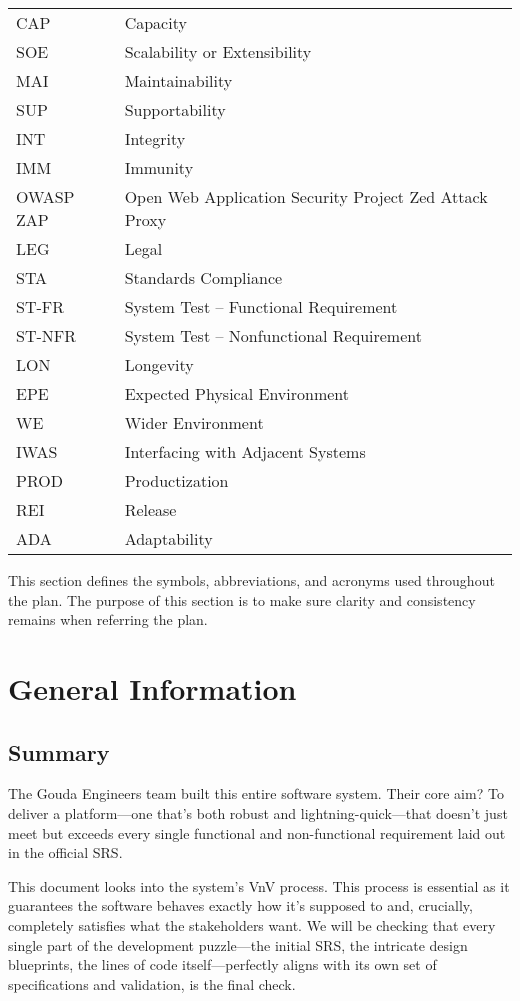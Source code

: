 \documentclass[12pt, titlepage]{article}
\begin{document}
\begin{longtable}{l l}
  CAP & Capacity \\
  SOE & Scalability or Extensibility \\
  MAI & Maintainability \\
  SUP & Supportability \\
  INT & Integrity \\
  IMM & Immunity \\
  OWASP ZAP & Open Web Application Security Project Zed Attack Proxy \\
  LEG & Legal \\
  STA & Standards Compliance \\
  ST-FR & System Test – Functional Requirement \\
  ST-NFR & System Test – Nonfunctional Requirement \\
  LON & Longevity \\
  EPE & Expected Physical Environment \\
  WE & Wider Environment \\
  IWAS & Interfacing with Adjacent Systems \\
  PROD & Productization \\
  REI & Release \\
  ADA & Adaptability \\
\end{longtable}


\newpage

This section defines the symbols, abbreviations, and acronyms used throughout the plan. The purpose of this section is to
 make sure clarity and 
consistency remains when referring the plan.

\section{General Information}

\subsection{Summary}

The Gouda Engineers team built this entire software system. Their core aim? To deliver a platform—one that's both
 robust and lightning-quick—that doesn't just meet but exceeds every single functional and non-functional requirement laid 
 out in the official SRS.

This document looks into the system's VnV process. This process 
is  essential as it guarantees the software  behaves exactly how it's supposed to and, crucially, completely
 satisfies what the stakeholders want. We will be checking that every single part of the development 
 puzzle—the initial SRS, the intricate design blueprints, the lines of code itself—perfectly aligns with its own set of 
 specifications and validation, is the final check.
\end{document}

